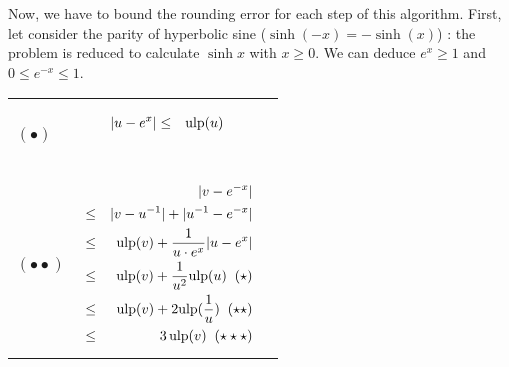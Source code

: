 \documentclass[12pt]{amsart}
\def\pinf{\bigtriangleup}
\def\minf{\bigtriangledown}
\def\ulp{{\rm ulp}}
\begin{document}
Now, we have to bound the rounding error for each step of this
algorithm.  First, let consider the parity of hyperbolic sine
($\sinh(-x)=-\sinh(x)$) : the problem is reduced to calculate $\sinh x$
with $x \geq 0$. We can deduce $e^x \geq 1$ and $0 \leq e^{-x} \leq
1$.



\begin{center}
\begin{tabular}{l|l |l}

\begin{minipage}{2.5cm}


${\textnormal{error}}(u)$


$u \leftarrow \minf(e^x)$\\
$(\bullet)$

\end{minipage} &
\begin{minipage}{7.5cm}

\begin{eqnarray}\nonumber
  |u-e^x| &\leq& \ulp(u)\\\nonumber
\end{eqnarray}

\end{minipage} &
\begin{minipage}{6cm}
{\hspace{7cm}}
\end{minipage}\\\hline
\begin{minipage}{2.5cm}
${\textnormal{error}}(v)$


$v \leftarrow \pinf({u}^{-1}) $\\
$(\bullet\bullet)$ 
\end{minipage} &
\begin{minipage}{7.5cm}



\begin{eqnarray}\nonumber
  &&|v-e^{-x}| \\\nonumber
  &       \leq&  |v - u^{-1}| +  |u^{-1}  - e^{-x}|\\\nonumber
  &       \leq& \ulp(v) + \frac{1}{u \cdot e^x} |u-e^{x}|\\\nonumber
  &       \leq& \ulp(v) + \frac{1}{u^2} \ulp(u)\;\;(\star)\\\nonumber
  &       \leq& \ulp(v) + 2 \ulp(\frac{1}{u})\;\;(\star\star)\\\nonumber
  &       \leq& 3 \, \ulp(v)\;\;(\star\star\star)
\end{eqnarray}



\end{minipage}
\end{tabular}
\end{center}
\end{document}
